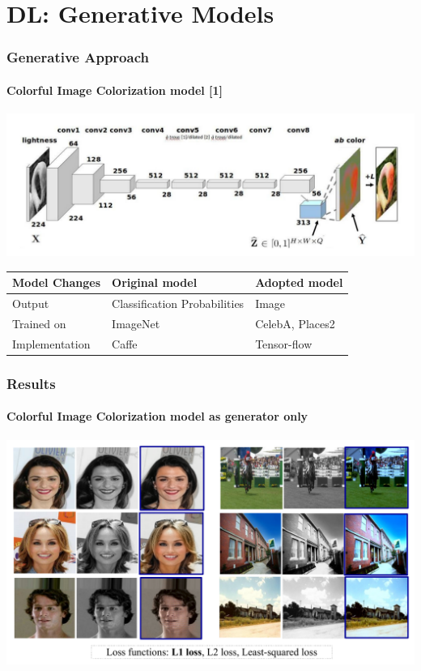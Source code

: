 \documentclass{beamer}
\begin{document}
\section*{DL: Generative Models}

\begin{frame}
\frametitle{\textbf{Generative Approach}}
\framesubtitle{\textbf{Colorful Image Colorization model [1]}}
\includegraphics[width=\linewidth]{7.pdf}


\begin{table}
\footnotesize
\centering
\begin{tabular}{|l|l|l|}
\hline 
\textbf{Model Changes} & {\textbf{Original model}}  & {\color{blue} \textbf{Adopted model}} \\
\hline \hline
Output & Classification  Probabilities & {\color{blue} Image}  \\ \hline
Trained on & ImageNet & {\color{blue} CelebA, Places2 }\\ \hline
Implementation & Caffe & {\color{blue}Tensor-flow} \\ \hline

\end{tabular}
\end{table}

\end{frame}

\begin{frame}
\frametitle{\textbf{Results}}
\framesubtitle{\textbf{Colorful Image Colorization model as generator only}}
\includegraphics[width=\linewidth]{81.pdf}
\end{frame}
\end{document}
